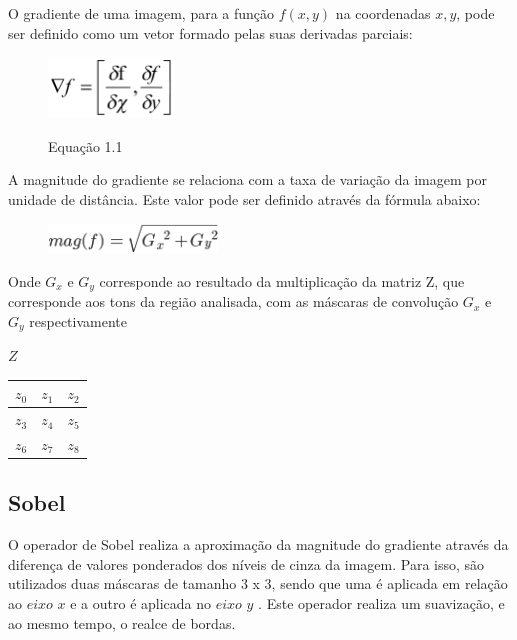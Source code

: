 \documentclass[
	12pt,				%
	oneside,			%
	a4paper,			%
	english,			%
	french,				%
	spanish,			%
	brazil,				%
	]{abntex2}
\begin{document}
O gradiente de uma imagem, para a função \(f(x,y)\) na coordenadas \(x,y\), pode ser definido como um vetor formado pelas suas derivadas parciais:

\begin{figure}[ht]
\centering
\includegraphics[width=0.3\textwidth]{imagens/gradiente.png}

Equação 1.1
\end{figure}

A magnitude do gradiente se relaciona com a taxa de variação da imagem por unidade de distância. Este valor pode ser definido através da fórmula abaixo:

\begin{figure}[ht]
\centering
\includegraphics[width=0.4\textwidth]{imagens/magnitude.png}
\end{figure}


Onde \(G_x\) e \(G_y\) corresponde ao resultado da multiplicação da matriz Z, que corresponde aos tons da região analisada, com as máscaras de convolução \(G_x\) e \(G_y\) respectivamente

\(Z\)
\begin{tabular}{|c|c|c|}
	\hline
    \(z_0\) & \(z_1\) & \(z_2\)   \\ \hline
	\(z_3\) & \(z_4\) & \(z_5\)   \\ \hline   
	\(z_6\) & \(z_7\) & \(z_8\)   \\ \hline   
\end{tabular}

\subsection{Sobel}

O operador de Sobel realiza a aproximação da magnitude do gradiente através da diferença de valores ponderados dos níveis de cinza da imagem. Para isso, são utilizados duas máscaras de tamanho 3 x 3, sendo que uma é aplicada em relação ao \(eixo\) \(x\) e a outro é aplicada no \(eixo\) \(y\) \cite{pedriniSchwartz:2008}. Este operador realiza um suavização, e ao mesmo tempo, o realce de bordas.
\end{document}

